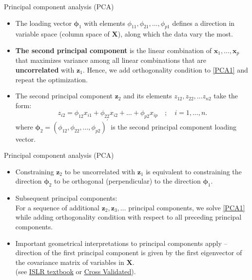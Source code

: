 \documentclass{beamer}
\begin{document}
\begin{frame}{Principal component analysis (PCA)}
\begin{itemize}
\item The loading vector $\bm{\phi}_1$ with elements $\phi_{11}, \phi_{21},\dots, \phi_{p1}$ defines a direction in variable space (column space of $\bm{X}$), along which the data vary the most.
\medskip
\item \textbf{The second principal component} is the linear combination
of $\bm{x}_1, \dots , \bm{x}_p$ that maximizes variance among all linear combinations that are \textbf{uncorrelated} with $\bm{z}_1$. Hence, we add orthogonality condition to \eqref{PCA1} and repeat the optimization.
\medskip
\item The second principal component $\bm{z}_2$ and its elements $z_{12}, z_{22}, \dots z_{n2}$ take the form:
$$z_{i2}= \phi_{12}x_{i1} + \phi_{22}x_{i2} + \dots + \phi_{p2}x_{ip} \,\,\,\,\,\,;\,\,\,\,\,\,            i=1,\dots,n.$$
where $\bm{\phi}_2 = (\phi_{12}, \phi_{22},\dots, \phi_{p2})^\prime$ is the second principal component loading vector.
\end{itemize}
\end{frame}
\begin{frame}{Principal component analysis (PCA)}
\begin{itemize}
\item Constraining $\bm{z}_2$ to be uncorrelated with $\bm{z}_1$ is equivalent to constraining the direction $\bm{\phi}_2$ to be orthogonal (perpendicular) to the direction $\bm{\phi}_1$. 
\medskip
\item Subsequent principal components: \\ \medskip For a sequence of additional $\bm{z}_2, \bm{z}_3,\dots$ principal components, we solve \eqref{PCA1} while adding orthogonality condition with respect to all preceding principal components.
\medskip
\item Important geometrical interpretations to principal components apply -- direction of the first principal component is given by the first eigenvector of the covariance matrix of variables in $\bm{X}$. \\(see \textcolor{blue}{\underline{\href{http://www-bcf.usc.edu/~gareth/ISL/}{ISLR textbook}}} or \textcolor{blue}{\underline{\href{https://stats.stackexchange.com/questions/2691/making-sense-of-principal-component-analysis-eigenvectors-eigenvalues}{Cross Validated}}}).
\end{itemize}
\end{frame}
\end{document}
